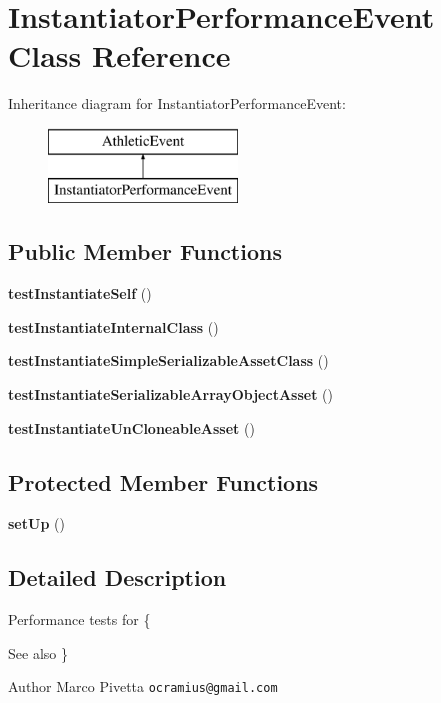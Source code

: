 \section{Instantiator\+Performance\+Event Class Reference}
\label{class_doctrine_test_1_1_instantiator_performance_1_1_instantiator_performance_event}
Inheritance diagram for Instantiator\+Performance\+Event\+:\begin{figure}[H]
\begin{center}
\leavevmode
\includegraphics[height=2.000000cm]{class_doctrine_test_1_1_instantiator_performance_1_1_instantiator_performance_event}
\end{center}
\end{figure}
\subsection*{Public Member Functions}
\begin{DoxyCompactItemize}
\item 
{\bf test\+Instantiate\+Self} ()
\item 
{\bf test\+Instantiate\+Internal\+Class} ()
\item 
{\bf test\+Instantiate\+Simple\+Serializable\+Asset\+Class} ()
\item 
{\bf test\+Instantiate\+Serializable\+Array\+Object\+Asset} ()
\item 
{\bf test\+Instantiate\+Un\+Cloneable\+Asset} ()
\end{DoxyCompactItemize}
\subsection*{Protected Member Functions}
\begin{DoxyCompactItemize}
\item 
{\bf set\+Up} ()
\end{DoxyCompactItemize}


\subsection{Detailed Description}
Performance tests for \{\begin{DoxySeeAlso}{See also}
\}
\end{DoxySeeAlso}
\begin{DoxyAuthor}{Author}
Marco Pivetta {\tt ocramius@gmail.\+com} 
\end{DoxyAuthor}


